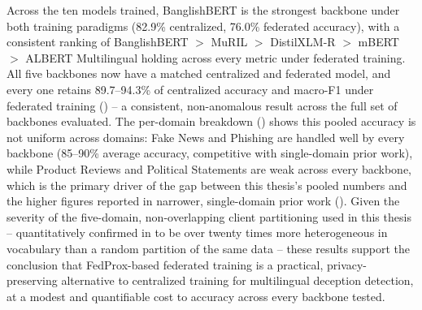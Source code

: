 Across the ten models trained, BanglishBERT is the strongest backbone under both training paradigms (82.9\% centralized, 76.0\% federated accuracy), with a consistent ranking of BanglishBERT $>$ MuRIL $>$ DistilXLM-R $>$ mBERT $>$ ALBERT Multilingual holding across every metric under federated training. All five backbones now have a matched centralized and federated model, and every one retains 89.7--94.3\% of centralized accuracy and macro-F1 under federated training () -- a consistent, non-anomalous result across the full set of backbones evaluated. The per-domain breakdown () shows this pooled accuracy is not uniform across domains: Fake News and Phishing are handled well by every backbone (85--90\% average accuracy, competitive with single-domain prior work), while Product Reviews and Political Statements are weak across every backbone, which is the primary driver of the gap between this thesis's pooled numbers and the higher figures reported in narrower, single-domain prior work (). Given the severity of the five-domain, non-overlapping client partitioning used in this thesis -- quantitatively confirmed in  to be over twenty times more heterogeneous in vocabulary than a random partition of the same data -- these results support the conclusion that FedProx-based federated training is a practical, privacy-preserving alternative to centralized training for multilingual deception detection, at a modest and quantifiable cost to accuracy across every backbone tested.
